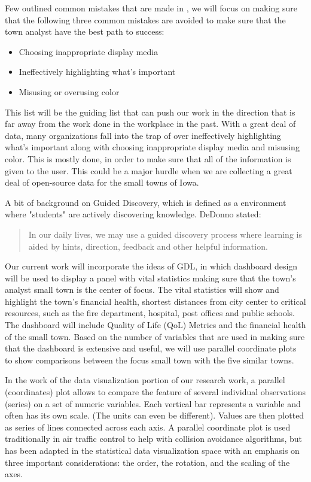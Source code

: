 \documentclass[10pt]{article}\usepackage[]{graphicx}\usepackage[]{color}
\begin{document}
Few outlined common mistakes that are made in , we will focus on making sure that the following three common mistakes are avoided to make sure that the town analyst have the best path to success:
\begin{itemize}
\item{Choosing inappropriate display media}
\item{Ineffectively highlighting what’s important}
\item{Misusing or overusing color}
\end{itemize}

This list will be the guiding list that can push our work in the direction that is far away from the work done in the workplace in the past. With a great deal of data, many organizations fall into the trap of over ineffectively highlighting what's important along with choosing inappropriate display media and misusing color. This is mostly done, in order to make sure that all of the information is given to the user. This could be a major hurdle when we are collecting a great deal of open-source data for the small towns of Iowa.

A bit of background on Guided Discovery, which is defined as a environment where "students" are actively discovering knowledge. DeDonno stated:
 \begin{quotation}
\small In our daily lives, we may use a guided discovery process where learning is aided by hints, direction, feedback and other helpful information.  \cite{mayer} \cite{dedonno}
 \end{quotation}


Our current work will incorporate the ideas of GDL, in which dashboard design will be used to display a panel with vital statistics making sure that the town's analyst small town is the center of focus. The vital statistics will show and highlight the town's financial health, shortest distances from city center to critical resources, such as the fire department, hospital, post offices and public schools. The dashboard will include Quality of Life (QoL) Metrics and the financial health of the small town. Based on the number of variables that are used in making sure that the dashboard is extensive and useful, we will use parallel coordinate plots to show comparisons between the focus small town with the five similar towns. 

In the work of the data visualization portion of our research work, a parallel (coordinates) plot allows to compare the feature of several individual observations (series) on a set of numeric variables. Each vertical bar represents a variable and often has its own scale. (The units can even be different). Values are then plotted as series of lines connected across each axis.
A parallel coordinate plot is used traditionally in air traffic control to help with collision avoidance algorithms, but has been adapted in the statistical data visualization space with an emphasis on three important considerations: the order, the rotation, and the scaling of the axes. 
\end{document}
